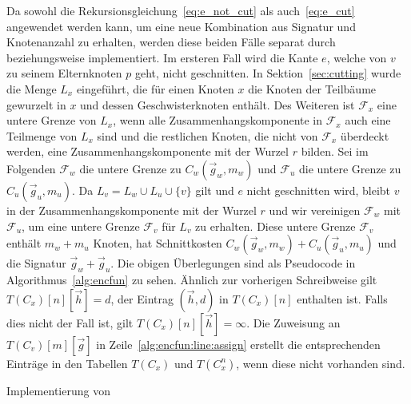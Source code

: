 Da sowohl die Rekursionsgleichung~\eqref{eq:e_not_cut} als auch~\eqref{eq:e_cut} angewendet werden kann, um eine neue Kombination aus Signatur und Knotenanzahl zu erhalten, werden diese beiden Fälle separat durch \encfun{} beziehungsweise \ecfun{} implementiert.
Im ersteren Fall wird die Kante $e$, welche von $v$ zu seinem Elternknoten $p$ geht, nicht geschnitten.
 In Sektion~\ref{sec:cutting} wurde die Menge $L_x$ eingeführt, die für einen Knoten $x$ die Knoten der Teilbäume gewurzelt in $x$ und dessen Geschwisterknoten enthält.
Des Weiteren ist $\mathcal{F}_x$ eine untere Grenze von $L_x$, wenn alle Zusammenhangskomponente in $\mathcal{F}_x$ auch eine Teilmenge von $L_x$ sind und die restlichen Knoten, die nicht von $\mathcal{F}_x$ überdeckt werden, eine Zusammenhangskomponente mit der Wurzel $r$ bilden.
Sei im Folgenden $\mathcal{F}_w$ die untere Grenze zu $C_w(\vec{g}_w, m_w)$ und $\mathcal{F}_u$ die untere Grenze zu $C_u(\vec{g}_u, m_u)$.
Da $L_v = L_w \cup L_u \cup \{v\}$ gilt und $e$ nicht geschnitten wird, bleibt $v$ in der Zusammenhangskomponente mit der Wurzel $r$ und wir vereinigen $\mathcal{F}_w$ mit $\mathcal{F}_u$, um eine untere Grenze $\mathcal{F}_v$ für $L_v$ zu erhalten.
Diese untere Grenze $\mathcal{F}_v$ enthält $m_w + m_u$ Knoten, hat Schnittkosten $C_w(\vec{g}_w, m_w) + C_u(\vec{g}_u, m_u)$ und die Signatur $\vec{g}_w + \vec{g}_u$.
Die obigen Überlegungen sind als Pseudocode in Algorithmus~\ref{alg:encfun} zu sehen.
Ähnlich zur vorherigen Schreibweise gilt $T(C_x)[n][\vec{h}] = d$, der Eintrag $(\vec{h}, d)$ in $T(C_x)[n]$ enthalten ist.
Falls dies nicht der Fall ist, gilt $T(C_x)[n][\vec{h}] = \infty$.
Die Zuweisung an $T(C_v)[m][\vec{g}]$ in Zeile~\ref{alg:encfun:line:assign} erstellt die entsprechenden Einträge in den Tabellen $T(C_x)$ und $T(C_x^n)$, wenn diese nicht vorhanden sind.

\begin{algorithm}
    \caption{Implementierung von }\label{alg:encfun}
    \begin{algorithmic}[1]
            \label{alg:encfun:line:assign}
        \EndFunction
    \end{algorithmic}
\end{algorithm}

